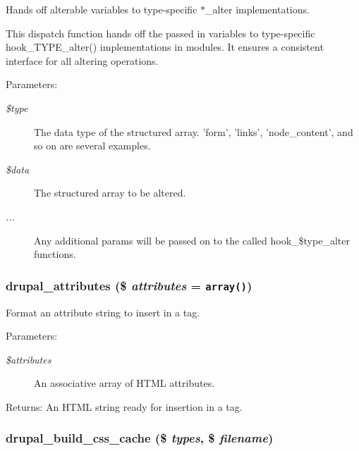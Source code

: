 Hands off alterable variables to type-specific $\ast$\_\-alter implementations.

This dispatch function hands off the passed in variables to type-specific hook\_\-TYPE\_\-alter() implementations in modules. It ensures a consistent interface for all altering operations.

\begin{Desc}
\item[Parameters:]
\begin{description}
\item[{\em \$type}]The data type of the structured array. 'form', 'links', 'node\_\-content', and so on are several examples. \item[{\em \$data}]The structured array to be altered. \item[{\em ...}]Any additional params will be passed on to the called hook\_\-\$type\_\-alter functions. \end{description}
\end{Desc}
\hypertarget{common_8inc_fcc26495094c3ea765071dfdc925ac27}{
\subsubsection[{drupal\_\-attributes}]{\setlength{\rightskip}{0pt plus 5cm}drupal\_\-attributes (\$ {\em attributes} = {\tt array()})}}
\label{common_8inc_fcc26495094c3ea765071dfdc925ac27}


Format an attribute string to insert in a tag.

\begin{Desc}
\item[Parameters:]
\begin{description}
\item[{\em \$attributes}]An associative array of HTML attributes. \end{description}
\end{Desc}
\begin{Desc}
\item[Returns:]An HTML string ready for insertion in a tag. \end{Desc}
\hypertarget{common_8inc_e7fa84b77f1c157964f0105d9b4a9476}{
\subsubsection[{drupal\_\-build\_\-css\_\-cache}]{\setlength{\rightskip}{0pt plus 5cm}drupal\_\-build\_\-css\_\-cache (\$ {\em types}, \/  \$ {\em filename})}}
\label{common_8inc_e7fa84b77f1c157964f0105d9b4a9476}


